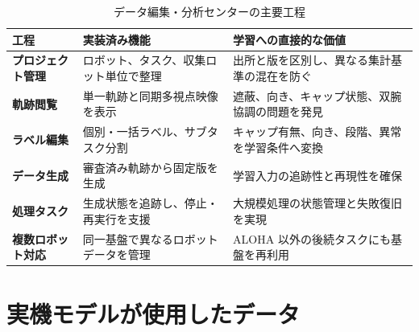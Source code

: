 \begin{table}[H]
\centering
\small
\caption{データ編集・分析センターの主要工程}
\begin{tabularx}{\textwidth}{>{\japanesesans\bfseries}p{27mm}p{47mm}X}
\toprule
工程 & 実装済み機能 & 学習への直接的な価値\\
\midrule
プロジェクト管理 & ロボット、タスク、収集ロット単位で整理 & 出所と版を区別し、異なる集計基準の混在を防ぐ\\
軌跡閲覧 & 単一軌跡と同期多視点映像を表示 & 遮蔽、向き、キャップ状態、双腕協調の問題を発見\\
ラベル編集 & 個別・一括ラベル、サブタスク分割 & キャップ有無、向き、段階、異常を学習条件へ変換\\
データ生成 & 審査済み軌跡から固定版を生成 & 学習入力の追跡性と再現性を確保\\
処理タスク & 生成状態を追跡し、停止・再実行を支援 & 大規模処理の状態管理と失敗復旧を実現\\
複数ロボット対応 & 同一基盤で異なるロボットデータを管理 & ALOHA 以外の後続タスクにも基盤を再利用\\
\bottomrule
\end{tabularx}
\end{table}



\section{実機モデルが使用したデータ}

